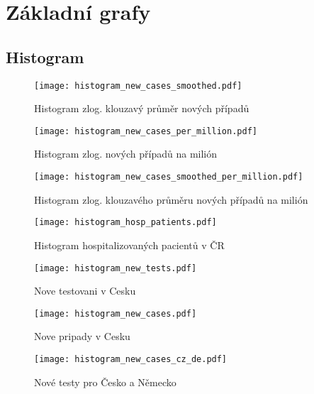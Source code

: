 \documentclass[a4paper]{ article}
\begin{document}
\section{Základní grafy}
\subsection{Histogram}
\begin{figure}[H]
\centering

\texttt{[image: histogram\_new\_cases\_smoothed.pdf]}
\caption{Histogram zlog. klouzavý průměr nových případů}

\texttt{[image: histogram\_new\_cases\_per\_million.pdf]}
\caption{Histogram zlog. nových případů na milión}

\end{figure}
\begin{figure}[H]
\centering

\texttt{[image: histogram\_new\_cases\_smoothed\_per\_million.pdf]}
\caption{Histogram zlog. klouzavého průměru nových případů na milión}

\texttt{[image: histogram\_hosp\_patients.pdf]}
\caption{Histogram hospitalizovaných pacientů v ČR}

\end{figure}
\begin{figure}[H]
\centering

\texttt{[image: histogram\_new\_tests.pdf]}
\caption{Nove testovani v Cesku}

\texttt{[image: histogram\_new\_cases.pdf]}
\caption{Nove pripady v Cesku}

\end{figure}
\begin{figure}[H]
\centering

\texttt{[image: histogram\_new\_cases\_cz\_de.pdf]}
\caption{Nové testy pro Česko a Německo}

\end{figure}
\end{document}
